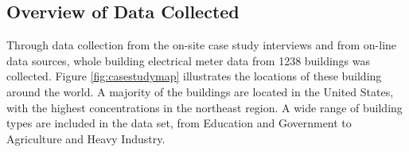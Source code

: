 \subsection{Overview of Data Collected}
\label{sec:datacollected}

Through data collection from the on-site case study interviews and from on-line data sources, whole building electrical meter data from 1238 buildings was collected. Figure \ref{fig:casestudymap} illustrates the locations of these building around the world. A majority of the buildings are located in the United States, with the highest concentrations in the northeast region. A wide range of building types are included in the data set, from Education and Government to Agriculture and Heavy Industry.
